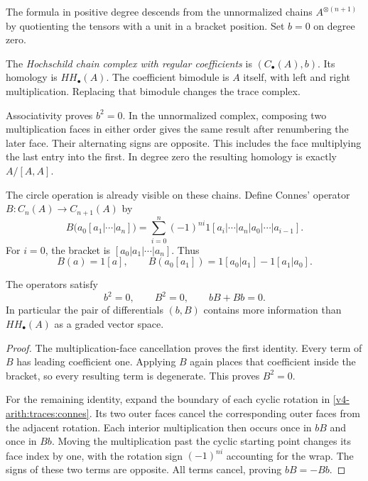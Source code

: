 The formula in positive degree descends from the unnormalized chains
$A^{\otimes(n+1)}$ by quotienting the tensors with a unit in a bracket
position. Set $b=0$ on degree zero.

\begin{definition}
\label{v4-arith:traces:regular-complex}
The \emph{Hochschild chain complex with regular coefficients} is
$(C_\bullet(A),b)$. Its homology is $HH_\bullet(A)$. The coefficient
bimodule is $A$ itself, with left and right multiplication. Replacing that
bimodule changes the trace complex.
\end{definition}

Associativity proves $b^2=0$. In the unnormalized complex, composing two
multiplication faces in either order gives the same result after renumbering
the later face. Their alternating signs are opposite. This includes the face
multiplying the last entry into the first. In degree zero the resulting
homology is exactly $A/[A,A]$.

The circle operation is already visible on these chains. Define Connes'
operator $B:C_n(A)\to C_{n+1}(A)$ by
\begin{equation}
\label{v4-arith:traces:connes}
 B\bigl(a_0[a_1|\cdots|a_n]\bigr)
 =\sum_{i=0}^{n}(-1)^{ni}
   1[a_i|\cdots|a_n|a_0|\cdots|a_{i-1}].
\end{equation}
For $i=0$, the bracket is $[a_0|a_1|\cdots|a_n]$. Thus
\[
 B(a)=1[a],\qquad
 B(a_0[a_1])=1[a_0|a_1]-1[a_1|a_0].
\]

\begin{proposition}
\label{v4-arith:traces:mixed-complex}
The operators satisfy
\[
 b^2=0,\qquad B^2=0,\qquad bB+Bb=0.
\]
In particular the pair of differentials $(b,B)$ contains more information
than $HH_\bullet(A)$ as a graded vector space.
\end{proposition}
\begin{proof}
The multiplication-face cancellation proves the first identity. Every term
of $B$ has leading coefficient one. Applying $B$ again places that
coefficient inside the bracket, so every resulting term is degenerate. This
proves $B^2=0$.

For the remaining identity, expand the boundary of each cyclic rotation in
\eqref{v4-arith:traces:connes}. Its two outer faces cancel the corresponding
outer faces from the adjacent rotation. Each interior multiplication then
occurs once in $bB$ and once in $Bb$. Moving the multiplication past the
cyclic starting point changes its face index by one, with the rotation sign
$(-1)^{ni}$ accounting for the wrap. The signs of these two terms are
opposite. All terms cancel, proving $bB=-Bb$.
\end{proof}

